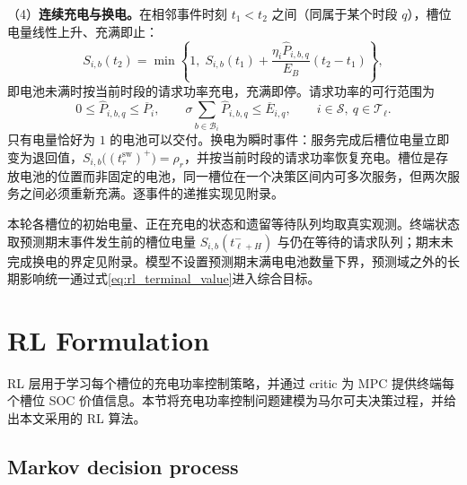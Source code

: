 \documentclass[12pt,a4paper,UTF8]{ctexart}
\begin{document}
（4）\textbf{连续充电与换电。}在相邻事件时刻 $t_1<t_2$ 之间（同属于某个时段 $q$），槽位电量线性上升、充满即止：
\begin{equation}
S_{i,b}(t_2)
=
\min\left\{
1,\;
S_{i,b}(t_1)
+
\frac{\eta_i\widehat P_{i,b,q}}{E_B}(t_2-t_1)
\right\},
\label{eq:event_charging_transition}
\end{equation}
即电池未满时按当前时段的请求功率充电，充满即停。请求功率的可行范围为
\begin{equation}
0\le \widehat P_{i,b,q}\le\overline P_i,
\qquad
\sigma\sum_{b\in\mathcal B_i}\widehat P_{i,b,q}
\le\overline E_{i,q},
\qquad i\in\mathcal S,\ q\in\mathcal T_\ell.
\label{eq:power_projection}
\end{equation}
只有电量恰好为 $1$ 的电池可以交付。换电为瞬时事件：服务完成后槽位电量立即变为退回值，$S_{i,b}\big((t_r^{\mathrm{sw}})^+\big)=\rho_r$，并按当前时段的请求功率恢复充电。槽位是存放电池的位置而非固定的电池，同一槽位在一个决策区间内可多次服务，但两次服务之间必须重新充满。逐事件的递推实现见附录。

本轮各槽位的初始电量、正在充电的状态和遗留等待队列均取真实观测。终端状态取预测期末事件发生前的槽位电量 $S_{i,b}(t_{\ell+H}^{-})$ 与仍在等待的请求队列；期末未完成换电的界定见附录。模型不设置预测期末满电电池数量下界，预测域之外的长期影响统一通过式\eqref{eq:rl_terminal_value}进入综合目标。



\section{RL Formulation}

RL 层用于学习每个槽位的充电功率控制策略，并通过 critic 为 MPC 提供终端每个槽位 SOC 价值信息。本节将充电功率控制问题建模为马尔可夫决策过程，并给出本文采用的 RL 算法。

\subsection{Markov decision process}
\end{document}
